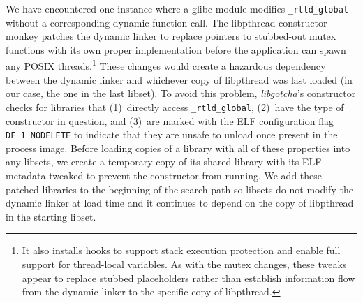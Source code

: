 We have encountered one instance where a glibc module modifies
\texttt{\_rtld\_global} without a corresponding dynamic function call.  The
libpthread constructor monkey patches the dynamic linker to replace pointers to
stubbed-out mutex functions with its own proper implementation before the application
can spawn any POSIX threads.\footnote{It also installs hooks to support stack
execution protection and enable full support for thread-local variables.  As with the
mutex changes, these tweaks appear to replace stubbed placeholders rather than
establish information flow from the dynamic linker to the specific copy of
libpthread.}  These changes would create a hazardous dependency between the dynamic
linker and whichever copy of libpthread was last loaded (in our case, the one in the
last libset).  To avoid this problem, \textit{libgotcha}'s constructor checks for
libraries that (1)~directly access \texttt{\_rtld\_global}, (2)~have the type of
constructor in question, and (3)~are marked with the ELF configuration flag
\texttt{DF\_1\_NODELETE} to indicate that they are unsafe to unload once present in
the process image.  Before loading copies of a library with all of these properties
into any libsets, we create a temporary copy of its shared library with its ELF
metadata tweaked to prevent the constructor from running.  We add these patched
libraries to the beginning of the search path so libsets do not modify the dynamic
linker at load time and it continues to depend on the copy of libpthread in the
starting libset.

